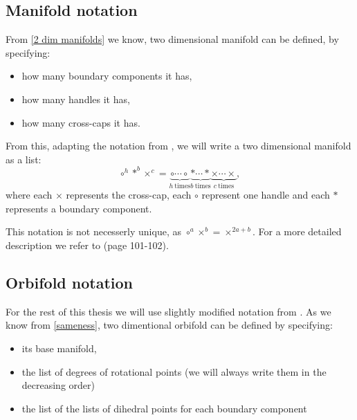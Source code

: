 \subsection{Manifold notation}
From \ref{2 dim manifolds} we know, two dimensional manifold 
can be 
defined, by specifying:
\begin{itemize}
\item how many boundary components it has,
\item how many handles it has,
\item how many cross-caps it has.
\end{itemize} 
From this, adapting the notation from \cite{Conway2016}, we will write 
a two dimensional manifold as a list: 
\begin{equation}
\circ^h*^b\times^c = \underbrace{\circ\cdots\circ}_{h\ \mathrm{times}} 
\underbrace{*\cdots*}_{b\ \mathrm{times}}\underbrace{\times\cdots \times }_{c\ \mathrm{times}},
\end{equation}
where each $\times$ represents the cross-cap, 
each $\circ$ represent one handle and each $*$ represents a boundary component.

This notation is not necesserly unique, as $\circ^a\times^b = \times^{2a+b}$. For a more 
detailed description we refer to \cite{Conway2016} (page 101-102).

\subsection{Orbifold notation}
For the rest of this thesis we will use slightly modified notation from \cite{Conway2016}.
As we know from \ref{sameness}, two dimentional orbifold can be defined 
by specifying:
\begin{itemize} 
\item its base manifold, 
\item the list of degrees of rotational points (we will 
always write them in the decreasing order) 
\item the list of the lists of dihedral points for each boundary component
\end{itemize}

